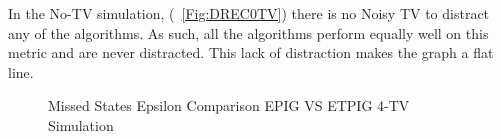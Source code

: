 \documentclass[12pt]{thesis}
\begin{document}
In the No-TV simulation, (\figurename~\ref{Fig:DREC0TV}) there is no Noisy TV to distract any of the algorithms. As such, all the algorithms perform equally well on this metric and are never distracted. This lack of distraction makes the graph a flat line.
\begin{figure}
	\begin{center}
		\hfill
			
		\hfill
	\end{center}
	\caption{Missed States Epsilon Comparison EPIG VS ETPIG 4-TV Simulation}
	\label{Fig:EMEC4TV}
\end{figure}
\end{document}
